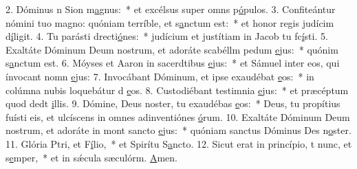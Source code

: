 2. Dóminus n Sion m\uline{a}gnus:~* et excélsus super omns p\uline{ó}pulos.
3. Confiteántur nómini tuo magno: quóniam terríble, et s\uline{a}nctum est:~* et honor regis judícim d\uline{í}ligit.
4. Tu parásti drecti\uline{ó}nes:~* judícium et justítiam in Jacob tu fc\uline{í}sti.
5. Exaltáte Dóminum Deum nostrum, et adoráte scabéllm pedum \uline{e}jus:~* quónim s\uline{a}nctum est.
6. Móyses et Aaron in sacerdtibus \uline{e}jus:~* et Sámuel inter eos, qui ínvocant nomn \uline{e}jus:
7. Invocábant Dóminum, et ipse exaudébat \uline{e}os:~* in colúmna nubis loquebátur d \uline{e}os.
8. Custodiébant testimnia \uline{e}jus:~* et præcéptum quod dedt \uline{i}llis.
9. Dómine, Deus noster, tu exaudébas \uline{e}os:~* Deus, tu propítius fuísti eis, et ulcíscens in omnes adinventiónes \uline{ó}rum.
10. Exaltáte Dóminum Deum nostrum, et adoráte in mont sancto \uline{e}jus:~* quóniam sanctus Dóminus Des n\uline{o}ster.
11. Glória Ptri, et F\uline{í}lio,~* et Spirítu S\uline{a}ncto.
12. Sicut erat in princípio, t nunc, et s\uline{e}mper,~* et in sǽcula sæculórm. \uline{A}men.
